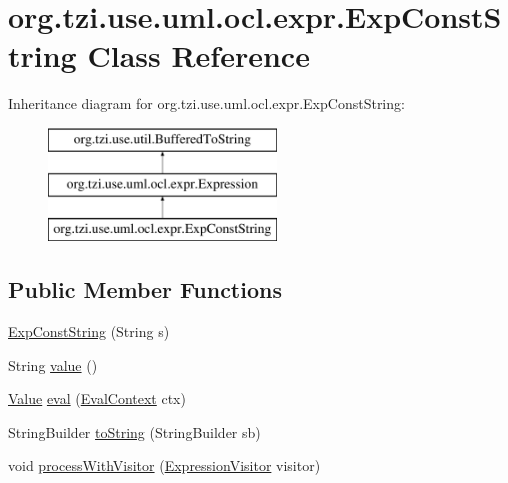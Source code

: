 \hypertarget{classorg_1_1tzi_1_1use_1_1uml_1_1ocl_1_1expr_1_1_exp_const_string}{\section{org.\-tzi.\-use.\-uml.\-ocl.\-expr.\-Exp\-Const\-String Class Reference}
\label{classorg_1_1tzi_1_1use_1_1uml_1_1ocl_1_1expr_1_1_exp_const_string}
}
Inheritance diagram for org.\-tzi.\-use.\-uml.\-ocl.\-expr.\-Exp\-Const\-String\-:\begin{figure}[H]
\begin{center}
\leavevmode
\includegraphics[height=3.000000cm]{classorg_1_1tzi_1_1use_1_1uml_1_1ocl_1_1expr_1_1_exp_const_string}
\end{center}
\end{figure}
\subsection*{Public Member Functions}
\begin{DoxyCompactItemize}
\item 
\hyperlink{classorg_1_1tzi_1_1use_1_1uml_1_1ocl_1_1expr_1_1_exp_const_string_afe191d6a88fa791f38c9d9c4da3b965d}{Exp\-Const\-String} (String s)
\item 
String \hyperlink{classorg_1_1tzi_1_1use_1_1uml_1_1ocl_1_1expr_1_1_exp_const_string_a975ee247538b87508153c04d21d93dfb}{value} ()
\item 
\hyperlink{classorg_1_1tzi_1_1use_1_1uml_1_1ocl_1_1value_1_1_value}{Value} \hyperlink{classorg_1_1tzi_1_1use_1_1uml_1_1ocl_1_1expr_1_1_exp_const_string_a4696f7477940beecf152f2330f49227b}{eval} (\hyperlink{classorg_1_1tzi_1_1use_1_1uml_1_1ocl_1_1expr_1_1_eval_context}{Eval\-Context} ctx)
\item 
String\-Builder \hyperlink{classorg_1_1tzi_1_1use_1_1uml_1_1ocl_1_1expr_1_1_exp_const_string_a33270ccf4ca72399f43c2f35dfb67469}{to\-String} (String\-Builder sb)
\item 
void \hyperlink{classorg_1_1tzi_1_1use_1_1uml_1_1ocl_1_1expr_1_1_exp_const_string_ad2ff7ea1a34dda63ed82c1185c852252}{process\-With\-Visitor} (\hyperlink{interfaceorg_1_1tzi_1_1use_1_1uml_1_1ocl_1_1expr_1_1_expression_visitor}{Expression\-Visitor} visitor)
\end{DoxyCompactItemize}

